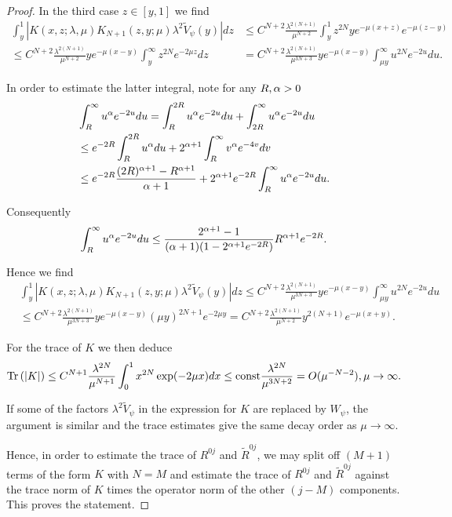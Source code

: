 \begin{proof}
In the third case $z\in [y,1]$ we find
\begin{align*}
\int_y^1 |K(x,z;\lambda,\mu) K_{N+1}(z,y;\mu)\lambda^2 \widetilde{V}_\psi(y)| dz 
&\leq C^{N+2} \frac{\lambda^{2(N+1)}}{\mu^{N+2}} 
\int_y^1 z^{2N} y e^{-\mu(x+z)} e^{-\mu(z-y)} \\
\leq C^{N+2} \frac{\lambda^{2(N+1)}}{\mu^{N+2}} y e^{-\mu(x-y)} 
\int_y^\infty z^{2N} e^{-2\mu z} dz 
&=C^{N+2} \frac{\lambda^{2(N+1)}}{\mu^{3N+3}} y e^{-\mu(x-y)} 
\int_{\mu y}^\infty u^{2N} e^{-2 u} du. 
\end{align*}

In order to estimate the latter integral, note for any $R,\mathrm{\alpha}>0$
\begin{align*}
&\int_{R}^\infty u^{\mathrm{\alpha}} e^{-2 u} du = \int_R^{2R} u^{\mathrm{\alpha}} e^{-2u} du 
+ \int_{2R}^\infty u^{\mathrm{\alpha}} e^{-2u} du  \\
&\leq e^{-2R}  \int_R^{2R} u^{\mathrm{\alpha}} du  + 2^{\mathrm{\alpha}+1} \int_{R}^\infty v^{\mathrm{\alpha}} e^{-4v} dv \\
&\leq e^{-2R} \frac{(2R)^{\mathrm{\alpha}+1} - R^{\mathrm{\alpha}+1}}{\mathrm{\alpha}+1}+ 2^{\mathrm{\alpha}+1} e^{-2R} 
\int_{R}^\infty u^{\mathrm{\alpha}} e^{-2 u} du.
\end{align*}

Consequently
\begin{align*}
\int_{R}^\infty u^{\mathrm{\alpha}} e^{-2 u} du \leq 
\frac{2^{\mathrm{\alpha}+1}-1}{(\mathrm{\alpha}+1)(1-2^{\mathrm{\alpha}+1} e^{-2R})} R^{\mathrm{\alpha}+1} e^{-2R}.
\end{align*}

Hence we find
\begin{align*}
&\int_y^1 |K(x,z;\lambda,\mu) K_{N+1}(z,y;\mu)\lambda^2 \widetilde{V}_\psi(y)| dz 
\leq C^{N+2} \frac{\lambda^{2(N+1)}}{\mu^{3N+3}} y e^{-\mu(x-y)} 
\int_{\mu y}^\infty u^{2N} e^{-2 u} du \\
&\leq C^{N+2} \frac{\lambda^{2(N+1)}}{\mu^{3N+3}} y e^{-\mu(x-y)} 
(\mu y)^{2N+1} e^{-2\mu y}= C^{N+2} \frac{\lambda^{2(N+1)}}{\mu^{N+2}} 
y^{2(N+1)} e^{-\mu(x+y)}.
\end{align*}

For the trace of $K$ we then deduce 
\begin{align*}
\textup{Tr} \left(|K|\right) \leq C^{N+1} \frac{\lambda^{2N}}{\mu^{N+1}} 
\int_0^1 x^{2N} \exp (-2 \mu x) dx 
\leq \textup{const} \frac{\lambda^{2N}}{\mu^{3N+2}} = O(\mu^{-N-2}), \mu \to \infty.
\end{align*}

If some of the factors $\lambda^2 \widetilde{V}_\psi$ in the expression for $K$ 
are replaced by $W_\psi$, the argument is similar and the trace estimates give 
the same decay order as $\mu \to \infty$. 

Hence, in order to estimate the trace of $R^{0j}$ and $\widetilde{R}^{0j}$, 
we may split off $(M+1)$ terms of the form $K$ with $N=M$ and estimate 
the trace of $R^{0j}$ and $\widetilde{R}^{0j}$ against the trace norm of 
$K$ times the operator norm of the other $(j-M)$ components. This proves 
the statement.
\end{proof}

